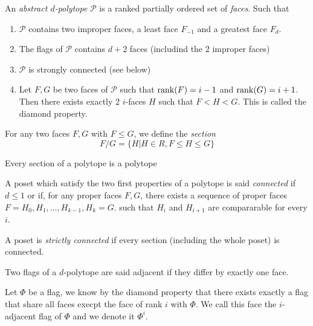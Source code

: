 \begin{definition}
  An \textit{abstract $d$-polytope} $\mathcal P$ is a ranked partially ordered set of \textit{faces}. Such that
  \begin{enumerate}
    \item $\mathcal P$ contains two improper faces, a least face $F_{-1}$ and a greatest face $F_d$.
    \item The flags of $\mathcal P$ contains $d + 2$ faces (includind the 2 improper faces)
    \item $\mathcal P$ is strongly connected (see below)
    \item Let $F, G$ be two faces of $\mathcal P$ such that $\operatorname{rank}(F) = i - 1$ and $\operatorname{rank}(G) = i + 1$. Then there exists exactly 2 $i$-faces $H$ such that $F < H < G$. This is called the diamond property.
  \end{enumerate}
\end{definition}

\begin{definition}
  For any two faces $F, G$ with $F \le G$, we define the \textit{section} \[
    F/G = \{H | H \in R, F \le H \le G\}
  \]
\end{definition}

\begin{property}
  Every section of a polytope is a polytope
\end{property}

\begin{definition}
  A poset which satisfy the two first properties of a polytope is said \textit{connected} if $d \le 1$ or if, for any proper faces $F, G$, there exists a sequence of proper faces $F = H_0, H_1, \dots, H_{k-1}, H_k = G$. such that $H_i$ and $H_{i+1}$ are compararable for every $i$.
\end{definition}

\begin{definition}
  A poset is \textit{strictly connected} if every section (including the whole poset) is connected.
\end{definition}

\begin{definition}
  Two flags of a $d$-polytope are said adjacent if they differ by exactly one face.
\end{definition}

\begin{definition}
  Let $\Phi$ be a flag, we know by the diamond property that there exists exactly a flag that share all faces execpt the face of rank $i$ with $\Phi$. We call this face the $i$-adjacent flag of $\Phi$ and we denote it $\Phi^i$.
\end{definition}

